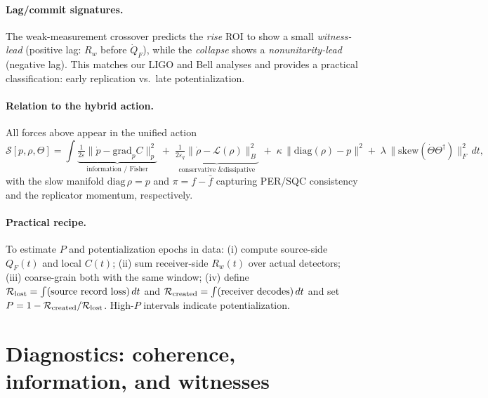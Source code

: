 \documentclass[11pt]{article}
\newcommand{\E}{\mathbb{E}}
\begin{document}
\paragraph{Lag/commit signatures.}
The weak-measurement crossover predicts the \emph{rise} ROI to show a small \emph{witness-lead} (positive lag: $R_w$ before $\dot Q_F$), while the \emph{collapse} shows a \emph{nonunitarity-lead} (negative lag).
This matches our LIGO and Bell analyses and provides a practical classification: early replication vs.\ late potentialization.

\paragraph{Relation to the hybrid action.}
All forces above appear in the unified action
\begin{equation}
\mathcal{S}[p,\rho,\Theta]=\!\int\!
\underbrace{\tfrac{1}{2\varepsilon}\big\|\dot p-\mathrm{grad}_p C\big\|_{p}^{2}}_{\text{information / Fisher}}\;
+\;\underbrace{\tfrac{1}{2\varepsilon_q}\big\|\dot\rho-\mathcal{L}(\rho)\big\|_{B}^{2}}_{\text{conservative \& dissipative}}\;
+\;\kappa\,\|\mathrm{diag}(\rho)-p\|^2
+\;\lambda\,\|\mathrm{skew}(\dot\Theta\Theta^\dagger)\|_F^2\,dt,
\end{equation}
with the slow manifold $\mathrm{diag}\,\rho=p$ and $\pi=f-\bar f$ capturing PER/SQC consistency and the replicator momentum, respectively.

\paragraph{Practical recipe.}
To estimate $P$ and potentialization epochs in data: (i) compute source-side $Q_F(t)$ and local $C(t)$; (ii) sum receiver-side $R_w(t)$ over actual detectors; (iii) coarse-grain both with the same window; (iv) define $\mathcal{R}_{\rm lost}=\int (\text{source record loss})\,dt$ and $\mathcal{R}_{\rm created}=\int (\text{receiver decodes})\,dt$ and set $P=1-\mathcal{R}_{\rm created}/\mathcal{R}_{\rm lost}$. High-$P$ intervals indicate potentialization.


\section{Diagnostics: coherence, information, and witnesses}\label{sec:diagnostics}

\end{document}
